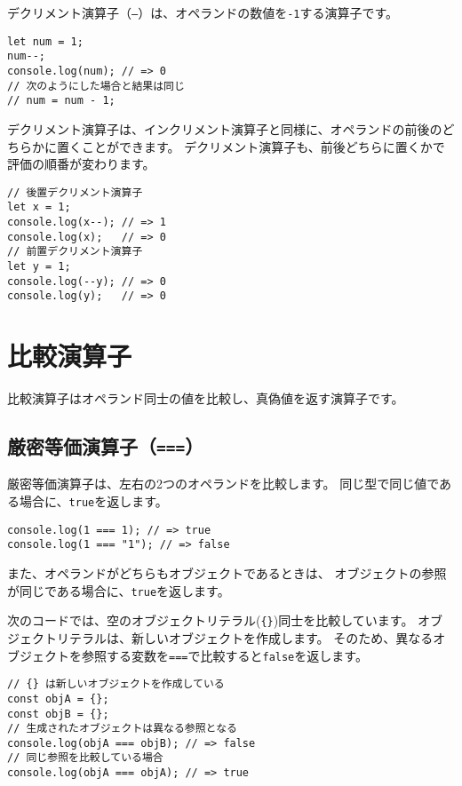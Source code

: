デクリメント演算子（\texttt{--}）は、オペランドの数値を\texttt{-1}する演算子です。

\begin{lstlisting}
let num = 1;
num--;
console.log(num); // => 0
// 次のようにした場合と結果は同じ
// num = num - 1;
\end{lstlisting}

デクリメント演算子は、インクリメント演算子と同様に、オペランドの前後のどちらかに置くことができます。
デクリメント演算子も、前後どちらに置くかで評価の順番が変わります。

\begin{lstlisting}
// 後置デクリメント演算子
let x = 1;
console.log(x--); // => 1
console.log(x);   // => 0
// 前置デクリメント演算子
let y = 1;
console.log(--y); // => 0
console.log(y);   // => 0
\end{lstlisting}

\hypertarget{comparison-operator}{%
\section{比較演算子}\label{comparison-operator}}

比較演算子はオペランド同士の値を比較し、真偽値を返す演算子です。

\hypertarget{strict-equal-operator}{%
\subsection{\texorpdfstring{厳密等価演算子（\texttt{===}）}{厳密等価演算子（===）}}\label{strict-equal-operator}}

厳密等価演算子は、左右の2つのオペランドを比較します。
同じ型で同じ値である場合に、\texttt{true}を返します。

\begin{lstlisting}
console.log(1 === 1); // => true
console.log(1 === "1"); // => false
\end{lstlisting}

また、オペランドがどちらもオブジェクトであるときは、
オブジェクトの参照が同じである場合に、\texttt{true}を返します。

次のコードでは、空のオブジェクトリテラル(\texttt{\{\}})同士を比較しています。
オブジェクトリテラルは、新しいオブジェクトを作成します。
そのため、異なるオブジェクトを参照する変数を\texttt{===}で比較すると\texttt{false}を返します。

\begin{lstlisting}
// {} は新しいオブジェクトを作成している
const objA = {};
const objB = {};
// 生成されたオブジェクトは異なる参照となる
console.log(objA === objB); // => false
// 同じ参照を比較している場合
console.log(objA === objA); // => true
\end{lstlisting}

